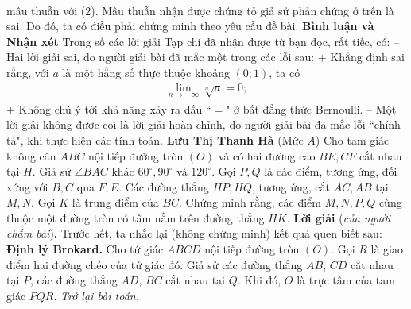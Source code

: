 \begin{multicols}{2}
\begin{align*}
	\end{align*}
	mâu thuẫn với ($2$).
	\vskip 0.05cm
	Mâu thuẫn nhận được chứng tỏ giả sử phản chứng ở trên là sai. Do đó, ta có điều phải chứng minh theo yêu cầu đề bài.
	\vskip 0.05cm
	\textbf{\color{thachthuctoanhoc}Bình luận và Nhận xét}
	\vskip 0.05cm
	Trong số các lời giải Tạp chí đã nhận được từ bạn đọc, rất tiếc, có:
	\vskip 0.05cm
	-- Hai lời giải sai, do người giải bài đã mắc một trong các lỗi sau:
	\vskip 0.05cm
	+ Khẳng định sai rằng, với $a$ là một hằng số thực thuộc khoảng $(0; 1)$, ta có 
	\begin{align*}
		\mathop {\lim }\limits_{n \to  + \infty } \sqrt[n]{a} = 0;
	\end{align*}
	+ Không chú ý tới khả năng xảy ra dấu ``$=$" ở bất đẳng thức Bernoulli.
	\vskip 0.05cm
	-- Một lời giải không được coi là lời giải hoàn chỉnh, do người giải bài đã mắc lỗi ``chính tả", khi thực hiện các tính toán.
	\vskip 0.1cm
	\hfill	\textbf{\color{thachthuctoanhoc}Lưu Thị Thanh Hà}
	\vskip 0.1cm
	{}
	(Mức $A$) Cho tam giác không cân $ABC$ nội tiếp đường tròn $(O)$ và có hai đường cao $BE,CF$ cắt nhau tại $H$. Giả sử   $\angle BAC$ khác $60^\circ,90^\circ$ và $120^\circ$.  Gọi $P, Q$ là các điểm, tương ứng, đối xứng với $B,C $ qua $F, E$. Các đường thẳng $HP, HQ$, tương ứng, cắt $AC, AB$ tại $M, N$.  Gọi $K$ là trung điểm của $BC$. Chứng minh rằng, các điểm $M, N, P, Q$ cùng thuộc một đường tròn có tâm nằm trên đường thẳng $HK$.
	\vskip 0.05cm
	\textbf{\color{thachthuctoanhoc}Lời giải} (\textit{của người chấm bài})\textbf{\color{thachthuctoanhoc}.}
	\vskip 0.05cm
	Trước hết, ta nhắc lại (không chứng minh) kết quả quen biết sau:
	\vskip 0.05cm
	\textbf{\color{thachthuctoanhoc}Định lý Brokard.} Cho tứ giác $ABCD$ nội tiếp đường tròn $(O)$. Gọi $R$ là giao điểm hai đường chéo của tứ giác đó. Giả sử các đường thẳng $AB$, $CD$ cắt nhau tại $P$, các đường thẳng $AD$, $BC$ cắt nhau tại $Q$.  Khi đó, $O$ là trực tâm của tam giác $PQR$.
	\vskip 0.05cm
	\textit{Trở lại bài toán.}
	\begin{figure}[H]
		\vspace*{-5pt}
		\centering
		\captionsetup{labelformat= empty, justification=centering}

\end{figure}
\end{multicols}
